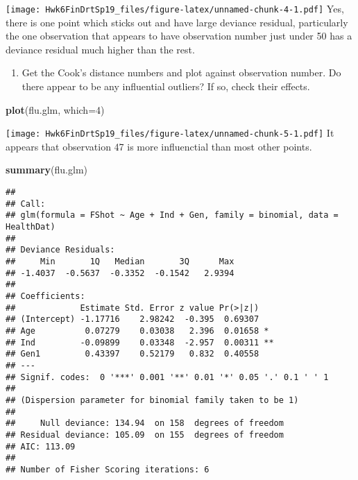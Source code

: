 \documentclass[]{article}
\newenvironment{Shaded}{\begin{snugshade}}{\end{snugshade}}
\newcommand{\KeywordTok}[1]{\textcolor[rgb]{0.13,0.29,0.53}{\textbf{#1}}}
\newcommand{\DataTypeTok}[1]{\textcolor[rgb]{0.13,0.29,0.53}{#1}}
\newcommand{\DecValTok}[1]{\textcolor[rgb]{0.00,0.00,0.81}{#1}}
\newcommand{\StringTok}[1]{\textcolor[rgb]{0.31,0.60,0.02}{#1}}
\newcommand{\OperatorTok}[1]{\textcolor[rgb]{0.81,0.36,0.00}{\textbf{#1}}}
\newcommand{\NormalTok}[1]{#1}
\providecommand{\tightlist}{%
  \setlength{\itemsep}{0pt}\setlength{\parskip}{0pt}}
\begin{document}
\begin{Shaded}
\end{Shaded}

\texttt{[image: Hwk6FinDrtSp19\_files/figure-latex/unnamed-chunk-4-1.pdf]}
Yes, there is one point which sticks out and have large deviance
residual, particularly the one observation that appears to have
observation number just under 50 has a deviance residual much higher
than the rest.

\begin{enumerate}
\def\labelenumi{\Alph{enumi})}
\setcounter{enumi}{4}
\tightlist
\item
  Get the Cook's distance numbers and plot against observation number.
  Do there appear to be any influential outliers? If so, check their
  effects.
\end{enumerate}

\begin{Shaded}
\begin{Highlighting}[]
\KeywordTok{plot}\NormalTok{(flu.glm, }\DataTypeTok{which=}\DecValTok{4}\NormalTok{)}
\end{Highlighting}
\end{Shaded}

\texttt{[image: Hwk6FinDrtSp19\_files/figure-latex/unnamed-chunk-5-1.pdf]}
It appears that observation 47 is more influenctial than most other
points.

\begin{Shaded}
\begin{Highlighting}[]
\KeywordTok{summary}\NormalTok{(flu.glm)}
\end{Highlighting}
\end{Shaded}

\begin{verbatim}
## 
## Call:
## glm(formula = FShot ~ Age + Ind + Gen, family = binomial, data = HealthDat)
## 
## Deviance Residuals: 
##     Min       1Q   Median       3Q      Max  
## -1.4037  -0.5637  -0.3352  -0.1542   2.9394  
## 
## Coefficients:
##             Estimate Std. Error z value Pr(>|z|)   
## (Intercept) -1.17716    2.98242  -0.395  0.69307   
## Age          0.07279    0.03038   2.396  0.01658 * 
## Ind         -0.09899    0.03348  -2.957  0.00311 **
## Gen1         0.43397    0.52179   0.832  0.40558   
## ---
## Signif. codes:  0 '***' 0.001 '**' 0.01 '*' 0.05 '.' 0.1 ' ' 1
## 
## (Dispersion parameter for binomial family taken to be 1)
## 
##     Null deviance: 134.94  on 158  degrees of freedom
## Residual deviance: 105.09  on 155  degrees of freedom
## AIC: 113.09
## 
## Number of Fisher Scoring iterations: 6
\end{verbatim}
\end{document}
